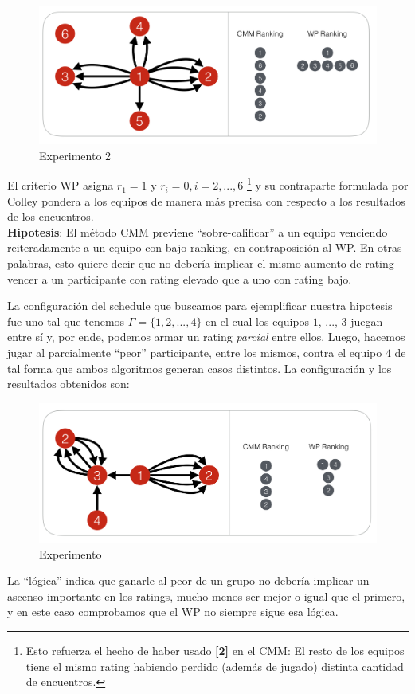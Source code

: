 \begin{figure}[h!]
  \begin{center}
	\includegraphics[scale=0.50]{imagenes/cualitative/comparative/comparative2.png}
	\caption{Experimento 2}
  \end{center}
\end{figure}
\newpage

El criterio WP asigna $r_1 = 1$ y $r_i = 0, i = 2, ..., 6$ \footnote{Esto refuerza el hecho de haber usado \textbf{[2]} en el CMM: El resto de los equipos tiene el mismo rating habiendo perdido (además de jugado) distinta cantidad de encuentros.} y su contraparte formulada por Colley pondera a los equipos de manera m\'as precisa con respecto a los resultados de los encuentros. \\

\textbf{Hipotesis}: El m\'etodo CMM previene ``sobre-calificar'' a un equipo venciendo reiteradamente a un equipo con bajo ranking, en contraposici\'on al WP. En otras palabras, esto quiere decir que no deber\'ia implicar el mismo aumento de rating vencer a un participante con rating elevado que a uno con rating bajo. 

La configuraci\'on del schedule que buscamos para ejemplificar nuestra hipotesis fue uno tal que tenemos $\Gamma = \{1,2,...,4\}$ en el cual los equipos $1$, ..., $3$ juegan entre s\'i y, por ende, podemos armar un rating \textit{parcial} entre ellos. Luego, hacemos jugar al parcialmente ``peor'' participante, entre los mismos, contra el equipo $4$ de tal forma que ambos algoritmos generan casos distintos. La configuraci\'on y los resultados obtenidos son:

\begin{figure}[h!]
  \begin{center}
	\includegraphics[scale=0.50]{imagenes/cualitative/comparative/comparative3.png}
	\caption{Experimento}
  \end{center}
\end{figure}


La ``l\'ogica'' indica que ganarle al peor de un grupo no deber\'ia implicar un ascenso importante en los ratings, mucho menos ser mejor o igual que el primero, y en este caso comprobamos que el WP no siempre sigue esa l\'ogica.
